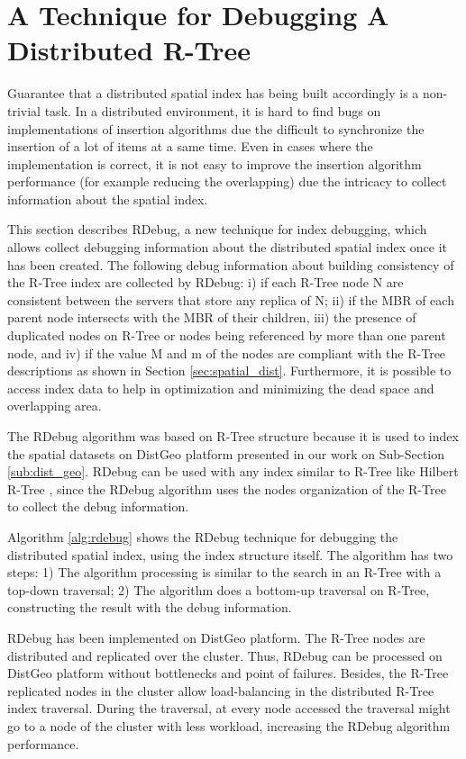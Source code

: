 \section{A Technique for Debugging A Distributed R-Tree}
\label{sec:rdebug}

Guarantee that a distributed spatial index has being built accordingly is a non-trivial task. 
In a distributed environment, it is hard to find bugs on implementations of insertion algorithms due the difficult to synchronize the insertion of a lot of items at a same time. 
Even in cases where the implementation is correct, it is not easy to improve the insertion algorithm performance (for example reducing the overlapping) 
due the intricacy to collect information about the spatial index.

This section describes RDebug, a new technique for index debugging, which allows collect debugging information about the distributed spatial index once it has been created. 
The following debug information about building consistency of the R-Tree index are collected by RDebug: 
i) if each R-Tree node N are consistent between the servers that store any replica of N;
ii) if the MBR of each parent node intersects with the MBR of their children, 
iii) the presence of duplicated nodes on R-Tree or nodes being referenced by more than one parent node, and 
iv) if the value M and m of the nodes are compliant with the R-Tree descriptions as shown in Section \ref{sec:spatial_dist}. 
Furthermore, it is possible to access index data to help in optimization and minimizing  the dead space and overlapping area.

The RDebug algorithm was based on R-Tree structure because it is used to index the spatial datasets on DistGeo platform presented in our work on Sub-Section \ref{sub:dist_geo}.
RDebug can be used with any index similar to R-Tree like Hilbert R-Tree \cite{kamel1994hilbert}, 
since the RDebug algorithm uses the nodes organization of the R-Tree to collect the debug information.

Algorithm \ref{alg:rdebug} shows the RDebug technique for debugging the distributed spatial index, using the index structure itself. The algorithm has two steps:
1) The algorithm processing is similar to the search in an R-Tree with a top-down traversal; 
2) The algorithm does a bottom-up traversal on R-Tree, constructing the result with the debug information.

RDebug has been implemented on DistGeo platform. The R-Tree nodes are distributed and replicated over the cluster. 
Thus, RDebug can be processed on DistGeo platform without bottlenecks and point of failures. 
Besides, the R-Tree replicated nodes in the cluster allow load-balancing in the distributed R-Tree index traversal. 
During the traversal, at every node accessed the traversal might go to a node of the cluster with less workload, increasing the RDebug algorithm performance. 

